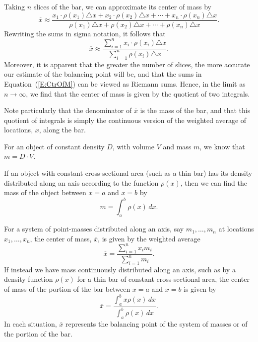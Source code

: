 Taking $n$ slices of the bar, we can approximate its center of mass by 
$$\overline{x} \approx \frac{x_1 \cdot \rho(x_1) \triangle x + x_2 \cdot \rho(x_2) \triangle x  + \cdots + x_n \cdot \rho(x_n) \triangle x }{\rho(x_1) \triangle x + \rho(x_2) \triangle x + \cdots + \rho(x_n) \triangle x}.$$
Rewriting the sums in sigma notation, it follows that
\begin{equation} \label{E:CtrOfM}
\overline{x} \approx \frac{\sum_{i = 1}^{n} x_i \cdot \rho(x_i) \triangle x}{\sum_{i = 1}^{n} \rho(x_i) \triangle x}.
\end{equation}
Moreover, it is apparent that the greater the number of slices, the more accurate our estimate of the balancing point will be, and that the sums in Equation~(\ref{E:CtrOfM}) can be viewed as Riemann sums.  Hence, in the limit as $n \to \infty$, we find that the center of mass is given by the quotient of two integrals.

\vspace*{5pt}
\nin {}
\vspace*{1pt}

Note particularly that the denominator of $\overline{x}$ is the mass of the bar, and that this quotient of integrals is simply the continuous version of the weighted average of locations, $x$, along the bar.




\begin{summary}
  \item For an object of constant density $D$, with volume $V$ and mass $m$, we know that $m = D \cdot V.$
  \item If an object with constant cross-sectional area (such as a thin bar) has its density distributed along an axis according to the function $\rho(x)$, then we can find the mass of the object between $x = a$ and $x = b$ by
  $$m = \int_a^b \rho(x) \, dx.$$
  \item For a system of point-masses distributed along an axis, say $m_1, \ldots, m_n$ at locations $x_1, \ldots, x_n$, the center of mass, $\overline{x}$, is given by the weighted average
  $$\overline{x} = \frac{\sum_{i=1}^n x_i m_i}{\sum_{i=1}^n m_i}.$$
  If instead we have mass continuously distributed along an axis, such as by a density function $\rho(x)$ for a thin bar of constant cross-sectional area, the center of mass of the portion of the bar between $x = a$ and $x = b$ is given by
  $$\overline{x} = \frac{\int_a^b x \rho(x) \, dx}{\int_a^b \rho(x) \, dx}.$$
  In each situation, $\overline{x}$ represents the balancing point of the system of masses or of the portion of the bar.
\end{summary}

\nin \hrulefill

 

\clearpage
